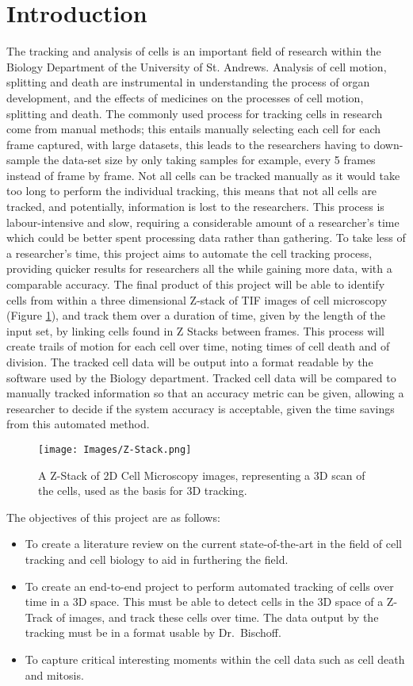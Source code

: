\documentclass[12pt a4paper]{article}
\begin{document}
\section{Introduction}
The tracking and analysis of cells is an important field of research within the Biology Department of the University of St. Andrews. Analysis of cell motion, splitting and death are instrumental in understanding the process of organ development, and the effects of medicines on the processes of cell motion, splitting and death. The commonly used process for tracking cells in research come from manual methods; this entails manually selecting each cell for each frame captured, with large datasets, this leads to the researchers having to down-sample the data-set size by only taking samples for example, every 5 frames instead of frame by frame. Not all cells can be tracked manually as it would take too long to perform the individual tracking, this means that not all cells are tracked, and potentially, information is lost to the researchers. This process is labour-intensive and slow, requiring a considerable amount of a researcher's time which could be better spent processing data rather than gathering. To take less of a researcher's time, this project aims to automate the cell tracking process, providing quicker results for researchers all the while gaining more data, with a comparable accuracy. The final product of this project will be able to identify cells from within a three dimensional Z-stack of TIF images of cell microscopy (Figure \ref{fig:z-stack}), and track them over a duration of time, given by the length of the input set, by linking cells found in Z Stacks between frames. This process will create trails of motion for each cell over time, noting times of cell death and of division. The tracked cell data will be output into a format readable by the software used by the Biology department. Tracked cell data will be compared to manually tracked information so that an accuracy metric can be given, allowing a researcher to decide if the system accuracy is acceptable, given the time savings from this automated method.
\begin{figure}
    \centering
    \texttt{[image: Images/Z-Stack.png]}
    \caption{A Z-Stack of 2D Cell Microscopy images, representing a 3D scan of the cells, used as the basis for 3D tracking.}
    \label{fig:z-stack}
\end{figure}
The objectives of this project are as follows:
\begin{itemize}
    \item To create a literature review on the current state-of-the-art in the field of cell tracking and cell biology to aid in furthering the field.
    \item To create an end-to-end project to perform automated tracking of cells over time in a 3D space. This must be able to detect cells in the 3D space of a Z-Track of images, and track these cells over time. The data output by the tracking must be in a format usable by Dr.~Bischoff.
    \item To capture critical interesting moments within the cell data such as cell death and mitosis.
\end{itemize}
\end{document}
